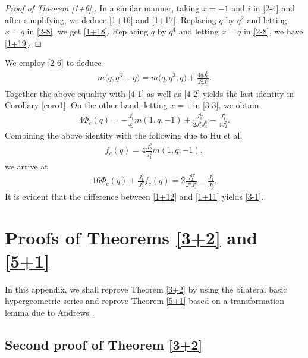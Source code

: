 \documentclass[pdftex]{sigma}
\numberwithin{equation}{section}
\begin{document}
\begin{proof}[Proof of Theorem \ref{1+6}.]
In a similar manner, taking $x=-1$ and $i$ in \eqref{2-4} and after simplifying, we deduce \eqref{1+16} and \eqref{1+17}.
Replacing $q$ by $q^2$ and letting $x=q$ in \eqref{2-8}, we get \eqref{1+18}. Replacing $q$ by $q^4$ and letting $x=q$ in \eqref{2-8}, we have \eqref{1+19}.
\end{proof}

\begin{Remark}
We employ \eqref{2-6} to deduce
\begin{align*}
m\bigl(q,q^3,-q\bigr)=m\bigl(q,q^3,q\bigr)+\frac{4qJ_6^6}{J_2^2J_3^3}.
\end{align*}
Together the above equality with \eqref{4-1} as well as \eqref{4-2} yields the last identity in Corollary \ref{coro1}.
On the other hand, letting $x=1$ in \eqref{3-3}, we obtain
\begin{align*}
4\varPhi_c(q)=-\frac{J_1^3}{J_2^3}m(1,q,-1)+\frac{J_2^{17}}{2J_1^8J_4^8}
-\frac{J_1^8}{4J_2^7}.
\end{align*}
Combining the above identity with the following due to Hu et al.~\cite{HSZ}
\begin{align*}%
f_c(q)=4\frac{J_2^2}{J_1^2}m(1,q,-1),
\end{align*}
we arrive at
\begin{align}\label{1+11}
16\varPhi_c(q)+\frac{J_1^5}{J_2^5}f_c(q)=2\frac{J_2^{17}}{J_1^8J_4^8}
-\frac{J_1^8}{J_2^7}.
\end{align}
It is evident that the difference between \eqref{1+12} and \eqref{1+11} yields \eqref{3-1}.
\end{Remark}

\appendix

\section[Proofs of Theorems 2.3 and 2.6]{Proofs of Theorems \ref{3+2} and \ref{5+1}}\label{appendixA}


In this appendix, we shall reprove Theorem \ref{3+2} by using the bilateral basic hypergeometric series and reprove Theorem \ref{5+1} based on a transformation lemma due to Andrews \cite{A}.

\subsection[Second proof of Theorem 2.3]{Second proof of Theorem \ref{3+2}} \label{sec2}
\end{document}
